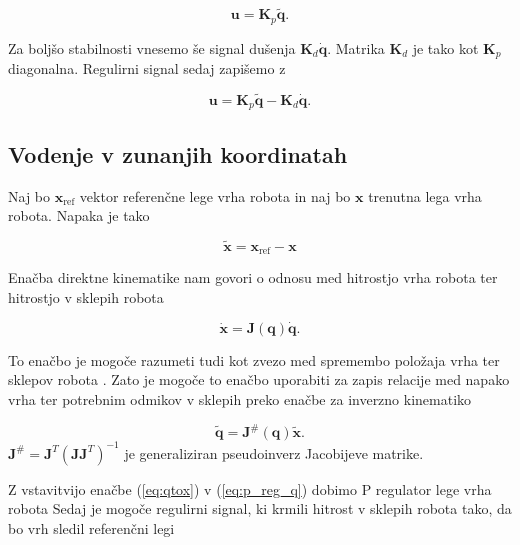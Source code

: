 \documentclass[a4paper]{article}
\begin{document}
\begin{equation} \label{eq:p_reg_q}
\textbf{u} = \textbf{K}_p  \tilde{\textbf{q}}.
\end{equation}


Za boljšo stabilnosti vnesemo še signal dušenja $\textbf{K}_d \dot{\mathbf{q}}$. Matrika $\textbf{K}_d$ je tako kot $\textbf{K}_p$ diagonalna. Regulirni signal sedaj zapišemo z

\begin{equation} \label{eq:pd_reg_q}
\textbf{u} = \textbf{K}_p \tilde{\mathbf{q}} - \textbf{K}_d \dot{\mathbf{q}}.
\end{equation}

\subsection{Vodenje v zunanjih koordinatah} \label{sec:admit_out}

Naj bo $\textbf{x}_{\mathrm{ref}}$ vektor referenčne lege vrha robota in naj bo $\textbf{x}$ trenutna lega vrha robota. Napaka je tako

\begin{equation} \label{eq:xerr}
\tilde{\textbf{x}} = \textbf{x}_{\mathrm{ref}}  - \textbf{x}
\end{equation}

Enačba direktne kinematike nam govori o odnosu med hitrostjo vrha robota ter hitrostjo v sklepih robota

\begin{equation} \label{eq:qtox}
\dot{\textbf{x}} = \textbf{J}(\textbf{q})  \dot{\textbf{q}}.
\end{equation}

To enačbo je mogoče razumeti tudi kot zvezo med spremembo položaja vrha ter sklepov robota \cite{mihelj_vodenje}. Zato je mogoče to enačbo uporabiti za zapis relacije med napako vrha ter potrebnim odmikov v sklepih preko enačbe za inverzno kinematiko

\begin{equation} \label{eq:qerr}
\tilde{\textbf{q}} = \textbf{J}^{\#}(\textbf{q})  \tilde{\textbf{x}}.
\end{equation}
$\mathbf{J}^{\#} =  \mathbf{J}^{T} (\mathbf{J} \mathbf{J}^T)^{-1}$ je generaliziran pseudoinverz Jacobijeve matrike.

Z vstavitvijo enačbe (\ref{eq:qtox}) v (\ref{eq:p_reg_q}) dobimo P regulator lege vrha robota Sedaj je mogoče regulirni signal, ki krmili hitrost v sklepih robota tako, da bo vrh sledil referenčni legi
\end{document}

